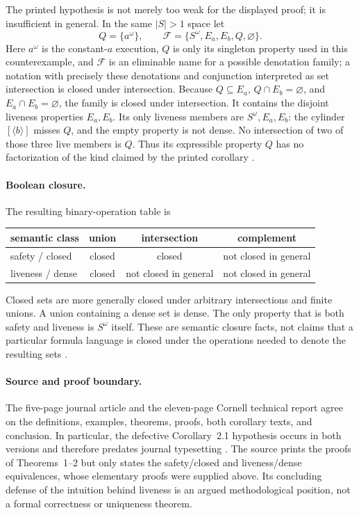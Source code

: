 The printed hypothesis is not merely too weak for the displayed proof; it is
insufficient in general.  In the same \(|S|>1\) space let
\[
 Q=\{a^\omega\},
 \qquad
\mathcal F=\{S^\omega,E_a,E_b,Q,\varnothing\}.
\]
Here \(a^\omega\) is the constant-\(a\) execution, \(Q\) is only its singleton
property used in this counterexample, and
\(\mathcal F\) is an eliminable name for a possible denotation family; a
notation with precisely these denotations and conjunction interpreted as set
intersection is closed under intersection.
Because \(Q\subseteq E_a\), \(Q\cap E_b=\varnothing\), and
\(E_a\cap E_b=\varnothing\), the family is closed under intersection.  It
contains the disjoint liveness properties \(E_a,E_b\).  Its only liveness
members are \(S^\omega,E_a,E_b\): the cylinder \([\langle b\rangle]\) misses
\(Q\), and the
empty property is not dense.  No intersection of two of those three live
members is \(Q\).  Thus its expressible property \(Q\) has no factorization of
the kind claimed by the printed corollary
\cite[Corollary~2.1, p.~184]{AlpernSchneider1985}.

\paragraph{Boolean closure.}
The resulting binary-operation table is
\begin{center}
\small
\begin{tabular}{@{}lccc@{}}
\toprule
semantic class & union & intersection & complement\\
\midrule
safety / closed & closed & closed & not closed in general\\
liveness / dense & closed & not closed in general & not closed in general\\
\bottomrule
\end{tabular}
\end{center}
Closed sets are more generally closed under arbitrary intersections and finite
unions.  A union containing a dense set is dense.  The only property that is
both safety and liveness is \(S^\omega\) itself.  These are semantic closure
facts, not claims that a particular formula language is closed under the
operations needed to denote the resulting sets
\cite[p.~184]{AlpernSchneider1985}.

\paragraph{Source and proof boundary.}
The five-page journal article and the eleven-page Cornell technical report
agree on the definitions, examples, theorems, proofs, both corollary texts, and
conclusion.  In particular, the defective Corollary~2.1 hypothesis occurs in
both versions and therefore predates journal typesetting
\cite{AlpernSchneider1985,AlpernSchneider1985TR}.  The source prints the proofs
of Theorems~1--2 but only states the safety/closed and liveness/dense
equivalences, whose elementary proofs were supplied above.  Its concluding
defense of the intuition behind liveness is an argued methodological position,
not a formal correctness or uniqueness theorem.

